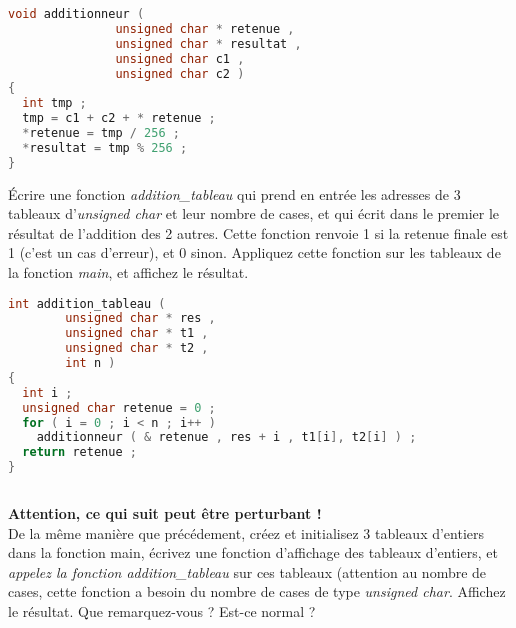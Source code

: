 \begin{solution}
  \begin{lstlisting}[language=C]
void additionneur (
		       unsigned char * retenue ,
		       unsigned char * resultat ,
		       unsigned char c1 ,
		       unsigned char c2 )
{
  int tmp ;
  tmp = c1 + c2 + * retenue ;
  *retenue = tmp / 256 ;
  *resultat = tmp % 256 ;
}    
  \end{lstlisting}
\end{solution}

\question Écrire une fonction \emph{addition\_tableau} qui prend en
entrée les adresses de 3 tableaux d'\emph{unsigned char} et leur
nombre de cases, et qui écrit dans le premier le résultat de
l'addition des 2 autres. Cette fonction renvoie 1 si la retenue finale
est 1 (c'est un cas d'erreur), et 0 sinon. Appliquez cette fonction
sur les tableaux de la fonction \emph{main}, et affichez le résultat.

\begin{solution}
  \begin{lstlisting}[language=C]
int addition_tableau (
		unsigned char * res ,
		unsigned char * t1 ,
		unsigned char * t2 ,
		int n )
{
  int i ;
  unsigned char retenue = 0 ;
  for ( i = 0 ; i < n ; i++ )
    additionneur ( & retenue , res + i , t1[i], t2[i] ) ;
  return retenue ;
}
  
  \end{lstlisting}
\end{solution}


\question \textbf{Attention, ce qui suit peut être perturbant !}\\
De la même manière que précédement, créez et initialisez 3 tableaux
d'entiers dans la fonction main, écrivez une fonction d'affichage des
tableaux d'entiers, et \emph{appelez la fonction addition\_tableau}
sur ces tableaux (attention au nombre de cases, cette fonction a
besoin du nombre de cases de type \emph{unsigned char}. Affichez le
résultat. Que remarquez-vous ? Est-ce normal ?

